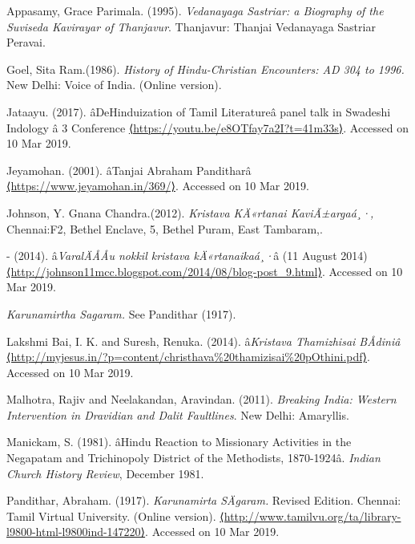 \begin{thebibliography}{99}
\itemsep=0pt

  Appasamy, Grace Parimala. (1995). \textit{Vedanayaga Sastriar: a Biography of the Suviseda Kavirayar of Thanjavur}. Thanjavur: Thanjai Vedanayaga Sastriar Peravai.

  Goel, Sita Ram.(1986).\textit{ History of Hindu-Christian Encounters: AD 304 to 1996. }New Delhi: Voice of India. (Online version).

  Jataayu. (2017). âDeHinduization of Tamil Literatureâ panel talk in Swadeshi Indology â 3 Conference \url{⟨https://youtu.be/e8OTfay7a2I?t=41m33s⟩}. Accessed on 10 Mar 2019.

  Jeyamohan. (2001). âTanjai Abraham Panditharâ \url{⟨https://www.jeyamohan.in/369/⟩}. Accessed on 10 Mar 2019.

  Johnson, Y. Gnana Chandra.(2012).\textit{ Kristava KÄ«rtanai KaviÃ±argaá¸·, }Chennai:F2, Bethel Enclave, 5, Bethel Puram, East Tambaram,.

  - (2014). â\textit{VaralÄÅÅu nokkil kristava kÄ«rtanaikaá¸·}â (11 August 2014) \url{⟨http://johnson11mcc.blogspot.com/2014/08/blog-post_9.html⟩}. Accessed on 10 Mar 2019.

  \textit{Karunamirtha Sagaram. }See Pandithar (1917).

  Lakshmi Bai, I. K. and Suresh, Renuka. (2014). â\textit{Kristava Thamizhisai BÅdiniâ} \url{⟨http://myjesus.in/?p=content/christhava%20thamizisai%20pOthini.pdf⟩}. Accessed on 10 Mar 2019.

  Malhotra, Rajiv and Neelakandan, Aravindan. (2011). \textit{Breaking India: Western Intervention in Dravidian and Dalit Faultlines}. New Delhi: Amaryllis.

  Manickam, S. (1981). âHindu Reaction to Missionary Activities in the Negapatam and Trichinopoly District of the Methodists, 1870-1924â. \textit{Indian Church History Review}, December 1981.

  Pandithar, Abraham. (1917). \textit{Karunamirta SÄgaram. }Revised Edition. Chennai: Tamil Virtual University. (Online version). \url{⟨http://www.tamilvu.org/ta/library-l9800-html-l9800ind-147220⟩}. Accessed on 10 Mar 2019.


\end{thebibliography}
